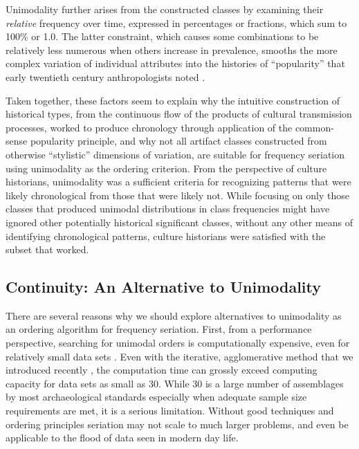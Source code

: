 Unimodality further arises from the constructed classes by examining their \emph{relative} frequency over time, expressed 
in percentages or fractions, which sum to 100\% or 1.0.  The latter constraint, which causes some combinations to be 
relatively less numerous when others increase in prevalence, smooths the more complex variation of individual attributes
into the histories of ``popularity'' that early twentieth century anthropologists noted .  

Taken together, these factors seem to explain why the intuitive
construction of historical types, from the continuous flow of the
products of cultural transmission processes, worked to produce
chronology through application of the common-sense popularity principle,
and why not all artifact classes constructed from otherwise
``stylistic'' dimensions of variation, are suitable for frequency
seriation using unimodality as the ordering criterion. From the
perspective of culture historians, unimodality was a sufficient criteria
for recognizing patterns that were likely chronological from those that
were likely not. While focusing on only those classes that produced
unimodal distributions in class frequencies might have ignored other
potentially historical significant classes, without any other means of
identifying chronological patterns, culture historians were satisfied
with the subset that worked.

\subsection{Continuity: An Alternative to
Unimodality}\label{continuity-an-alternative-to-unimodality}

There are several reasons why we should explore alternatives to
unimodality as an ordering algorithm for frequency seriation. First,
from a performance perspective, searching for unimodal orders is
computationally expensive, even for relatively small data sets
\citep{Madsen2014}. Even with the iterative, agglomerative method that
we introduced recently \citep{lipomadsendunnell2015}, the computation
time can grossly exceed computing capacity for data sets as small as 30.
While 30 is a large number of assemblages by most archaeological
standards especially when adequate sample size requirements are met, it
is a serious limitation. Without good techniques and ordering principles
seriation may not scale to much larger problems, and even be applicable
to the flood of data seen in modern day life.

